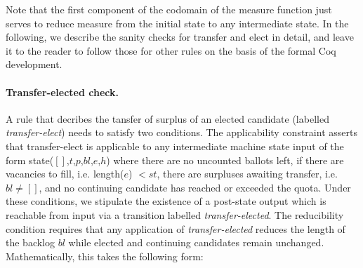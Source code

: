 \documentclass{llncs}
\begin{document}
\noindent
Note that the first component of the codomain of the measure
function just serves to reduce measure from the initial state to any
intermediate state. In the following, we describe
the sanity checks for transfer and elect in detail, and leave it to
the reader to follow those for other rules on the basis of the
formal Coq development.

\paragraph{Transfer-elected check.} A rule that decribes the tansfer
of surplus of an elected candidate (labelled \emph{transfer-elect})
needs to satisfy two conditions. The applicability constraint
asserts that  transfer-elect is applicable to 
any intermediate machine state \textsf{input} of the
form \textsf{state}($[]$,$t$,$p$,$bl$,$e$,$h$) where there are no
uncounted ballots left, if there are vacancies to fill, i.e.
\textsf{length}($e$) $< st$, there are surpluses awaiting transfer,
i.e. $bl \neq []$, and no continuing candidate has reached or
exceeded the quota. Under these conditions, we stipulate the
existence of a post-state 
\textsf{output} which is reachable from \textsf{input} via a
transition labelled \emph{transfer-elected}. 
The reducibility condition requires that any application of
\emph{transfer-elected} reduces the length of the backlog
$\mathit{bl}$ while elected and continuing candidates remain
unchanged.  Mathematically, this takes the following form:
\end{document}
